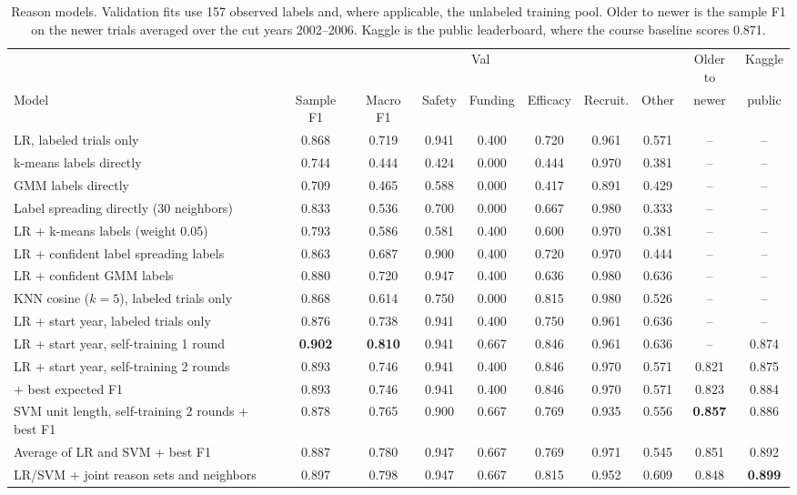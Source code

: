 \documentclass[10pt,twocolumn,letterpaper]{article}
\begin{document}
\begin{table}[!t]
\centering
\footnotesize
\setlength{\tabcolsep}{4.75pt}
\begin{tabular}{lccccccccc}
\hline
 & \multicolumn{7}{c}{Val} & Older to & Kaggle \\
Model & Sample F1 & Macro F1 & Safety & Funding & Efficacy & Recruit. & Other & newer & public \\
\hline
LR, labeled trials only & 0.868 & 0.719 & 0.941 & 0.400 & 0.720 & 0.961 & 0.571 & -- & -- \\
k-means labels directly & 0.744 & 0.444 & 0.424 & 0.000 & 0.444 & 0.970 & 0.381 & -- & -- \\
GMM labels directly & 0.709 & 0.465 & 0.588 & 0.000 & 0.417 & 0.891 & 0.429 & -- & -- \\
Label spreading directly (30 neighbors) & 0.833 & 0.536 & 0.700 & 0.000 & 0.667 & 0.980 & 0.333 & -- & -- \\
LR + k-means labels (weight 0.05) & 0.793 & 0.586 & 0.581 & 0.400 & 0.600 & 0.970 & 0.381 & -- & -- \\
LR + confident label spreading labels & 0.863 & 0.687 & 0.900 & 0.400 & 0.720 & 0.970 & 0.444 & -- & -- \\
LR + confident GMM labels & 0.880 & 0.720 & 0.947 & 0.400 & 0.636 & 0.980 & 0.636 & -- & -- \\
KNN cosine ($k=5$), labeled trials only & 0.868 & 0.614 & 0.750 & 0.000 & 0.815 & 0.980 & 0.526 & -- & -- \\
LR + start year, labeled trials only & 0.876 & 0.738 & 0.941 & 0.400 & 0.750 & 0.961 & 0.636 & -- & -- \\
LR + start year, self-training 1 round & \textbf{0.902} & \textbf{0.810} & 0.941 & 0.667 & 0.846 & 0.961 & 0.636 & -- & 0.874 \\
LR + start year, self-training 2 rounds & 0.893 & 0.746 & 0.941 & 0.400 & 0.846 & 0.970 & 0.571 & 0.821 & 0.875 \\
\quad + best expected F1 & 0.893 & 0.746 & 0.941 & 0.400 & 0.846 & 0.970 & 0.571 & 0.823 & 0.884 \\
SVM unit length, self-training 2 rounds + best F1 & 0.878 & 0.765 & 0.900 & 0.667 & 0.769 & 0.935 & 0.556 & \textbf{0.857} & 0.886 \\
Average of LR and SVM + best F1 & 0.887 & 0.780 & 0.947 & 0.667 & 0.769 & 0.971 & 0.545 & 0.851 & 0.892 \\
LR/SVM + joint reason sets and neighbors & 0.897 & 0.798 & 0.947 & 0.667 & 0.815 & 0.952 & 0.609 & 0.848 & \textbf{0.899} \\
\hline
\end{tabular}
\caption{Reason models. Validation fits use 157 observed labels and, where applicable, the unlabeled training pool. Older to newer is the sample F1 on the newer trials averaged over the cut years 2002--2006. Kaggle is the public leaderboard, where the course baseline scores 0.871.}
\label{tab:reasons}
\end{table}
\end{document}
